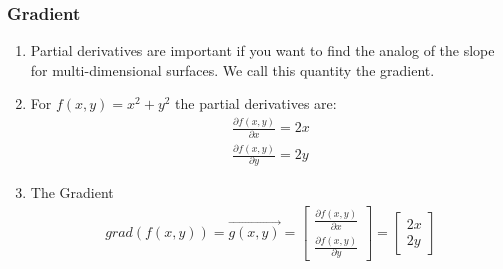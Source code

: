 



  




 \begin{frame}[fragile] \frametitle{Gradient}

\begin{enumerate}
  \item Partial derivatives are important if you want to find the analog of the slope for multi-dimensional surfaces. We call this quantity the gradient.
 \item For $f(x,y) = x^2 + y^2$ the partial derivatives are:
 \begin{align}
 \frac{\partial f(x,y)}{\partial x} = 2x \\
\frac{\partial f(x,y)}{\partial y} = 2y
\end{align}
\item The Gradient
\begin{eqnarray*}
grad(f(x,y)) =  \vec{g(x,y)} = \begin{bmatrix}\frac{\partial f(x,y)}{\partial x} \\ \frac{\partial f(x,y)}{\partial y} \end{bmatrix} = \begin{bmatrix}2x \\ 2y \end{bmatrix}
\end{eqnarray*}

\end{enumerate}
 

\end{frame}


